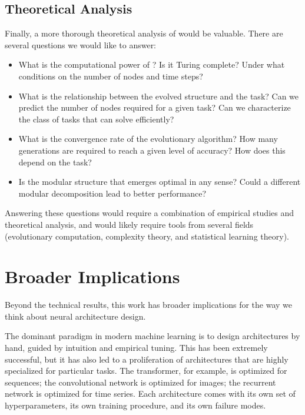 \subsection{Theoretical Analysis}
\label{sec:future-theory}

Finally, a more thorough theoretical analysis of \modnet{} would be
valuable. There are several questions we would like to answer:

\begin{itemize}
  \item What is the computational power of \modnet{}? Is it Turing
    complete? Under what conditions on the number of nodes and time
    steps?
  \item What is the relationship between the evolved structure and
    the task? Can we predict the number of nodes required for a
    given task? Can we characterize the class of tasks that \modnet{}
    can solve efficiently?
  \item What is the convergence rate of the evolutionary algorithm?
    How many generations are required to reach a given level of
    accuracy? How does this depend on the task?
  \item Is the modular structure that emerges optimal in any sense?
    Could a different modular decomposition lead to better
    performance?
\end{itemize}

Answering these questions would require a combination of empirical
studies and theoretical analysis, and would likely require tools from
several fields (evolutionary computation, complexity theory, and
statistical learning theory).

\section{Broader Implications}
\label{sec:broader}

Beyond the technical results, this work has broader implications for
the way we think about neural architecture design.

The dominant paradigm in modern machine learning is to design
architectures by hand, guided by intuition and empirical tuning. This
has been extremely successful, but it has also led to a proliferation
of architectures that are highly specialized for particular tasks.
The transformer, for example, is optimized for sequences; the
convolutional network is optimized for images; the recurrent network
is optimized for time series. Each architecture comes with its own
set of hyperparameters, its own training procedure, and its own
failure modes.

